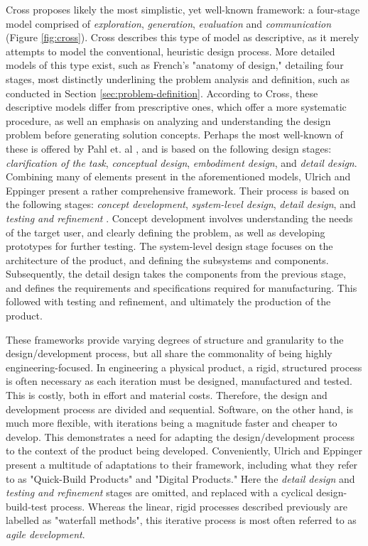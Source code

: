 Cross \cite{cross} proposes likely the most simplistic, yet well-known framework: a four-stage model comprised of \textit{exploration}, \textit{generation}, \textit{evaluation} and \textit{communication} (Figure \ref{fig:cross}). Cross describes this type of model as descriptive, as it merely attempts to model the conventional, heuristic design process. More detailed models of this type exist, such as French's \cite{french} "anatomy of design," detailing four stages, most distinctly underlining the problem analysis and definition, such as conducted in Section \ref{sec:problem-definition}. According to Cross, these descriptive models differ from prescriptive ones, which offer a more systematic procedure, as well an emphasis on analyzing and understanding the design problem before generating solution concepts. Perhaps the most well-known of these is offered by Pahl et. al \cite{pahl_beitz}, and is based on the following design stages: \textit{clarification of the task}, \textit{conceptual design}, \textit{embodiment design}, and \textit{detail design}. Combining many of elements present in the aforementioned models, Ulrich and Eppinger present a rather comprehensive framework. Their process is based on the following stages: \textit{concept development}, \textit{system-level design}, \textit{detail design}, and \textit{testing and refinement} \cite{ulrich_eppinger}. Concept development involves understanding the needs of the target user, and clearly defining the problem, as well as developing prototypes for further testing. The system-level design stage focuses on the architecture of the product, and defining the subsystems and components. Subsequently, the detail design takes the components from the previous stage, and defines the requirements and specifications required for manufacturing. This followed with testing and refinement, and ultimately the production of the product.

These frameworks provide varying degrees of structure and granularity to the design/development process, but all share the commonality of being highly engineering-focused. In engineering a physical product, a rigid, structured process is often necessary as each iteration must be designed, manufactured and tested. This is costly, both in effort and material costs. Therefore, the design and development process are divided and sequential. Software, on the other hand, is much more flexible, with iterations being a magnitude faster and cheaper to develop. This demonstrates a need for adapting the design/development process to the context of the product being developed. Conveniently, Ulrich and Eppinger present a multitude of adaptations to their framework, including what they refer to as "Quick-Build Products" and "Digital Products." Here the \textit{detail design} and \textit{testing and refinement} stages are omitted, and replaced with a cyclical design-build-test process. Whereas the linear, rigid processes described previously are labelled as "waterfall methods", this iterative process is most often referred to as \textit{agile development}.


